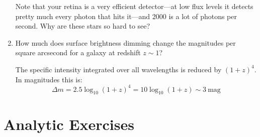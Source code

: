 \begin{enumerate}
\begin{answer}
Note that your retina is a very efficient detector---at low flux
levels it detects pretty much every photon that hits it---and 2000 is
a lot of photons per second. Why are these stars so hard to see?
\end{answer}

\item How much does surface brightness dimming change the magnitudes
  per square arcsecond for a galaxy at redshift $z\sim 1$?

\begin{answer}
The specific intensity integrated over all wavelengths is reduced by
$(1+z)^4$. In magnitudes this is:
\begin{equation}
\Delta m = 2.5 \log_{10} (1+z)^4 = 10 \log_{10} (1+z) \sim
3 \mathrm{~mag}
\end{equation}
\end{answer}
\end{enumerate}   

\section{Analytic Exercises}

